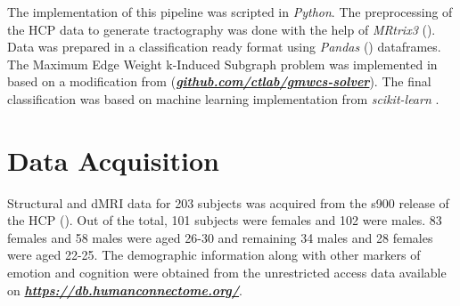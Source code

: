 \documentclass[msthesis.tex]{subfiles}
\begin{document}
The implementation of this pipeline was scripted in \textit{Python}. The preprocessing of the \gls{HCP} data to generate tractography was done with the help of \textit{MRtrix3} (\cite{tournier2019mrtrix3}). Data was prepared in a classification ready format using \textit{Pandas} (\cite{mckinney2011pandas}) dataframes. The Maximum Edge Weight k-Induced Subgraph problem was implemented in  based on a modification from \cite{DBLP:journals/corr/LobodaAS16} (\href{https://github.com/ctlab/gmwcs-solver}{\textbf{\textit{github.com/ctlab/gmwcs-solver}}}). The final classification was based on machine learning implementation from \textit{scikit-learn} \citep{sklearn_2012}. 

\section{Data Acquisition}
\label{sec:acquisition}
Structural and \gls{dMRI} data for 203 subjects was acquired from the s900 release of the \gls{HCP} (\cite{hcp2015wu}). Out of the total, 101 subjects were females and 102 were males. 83 females and 58 males were aged 26-30 and remaining 34 males and 28 females were aged 22-25. The demographic information along with other markers of emotion and cognition were obtained from the unrestricted access data available on \href{https://db.humanconnectome.org/}{\textbf{\textit{https://db.humanconnectome.org/}}}.
\end{document}
